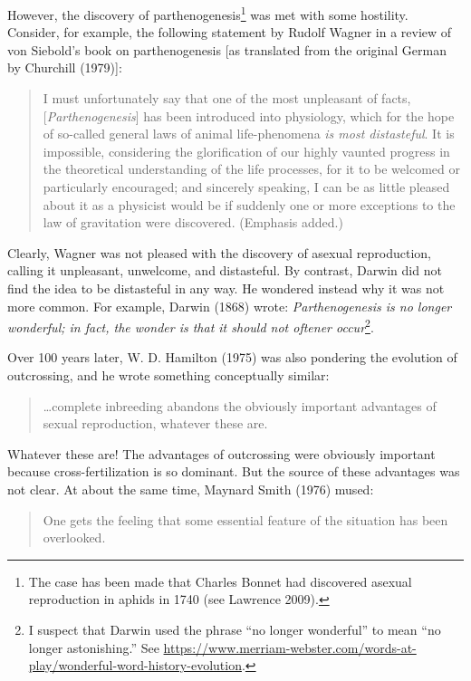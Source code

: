 \documentclass[
  letterpaper,
]{book}
\begin{document}
However, the discovery of parthenogenesis\footnote{The case has been
  made that Charles Bonnet had discovered asexual reproduction in aphids
  in 1740 (see Lawrence 2009).} was met with some hostility. Consider,
for example, the following statement by Rudolf Wagner in a review of von
Siebold's book on parthenogenesis {[}as translated from the original
German by Churchill (1979){]}:

\begin{quote}
I must unfortunately say that one of the most unpleasant of facts,
{[}\emph{Parthenogenesis}{]} has been introduced into physiology, which
for the hope of so-called general laws of animal life-phenomena \emph{is
most distasteful}. It is impossible, considering the glorification of
our highly vaunted progress in the theoretical understanding of the life
processes, for it to be welcomed or particularly encouraged; and
sincerely speaking, I can be as little pleased about it as a physicist
would be if suddenly one or more exceptions to the law of gravitation
were discovered. (Emphasis added.)
\end{quote}

Clearly, Wagner was not pleased with the discovery of asexual
reproduction, calling it unpleasant, unwelcome, and distasteful. By
contrast, Darwin did not find the idea to be distasteful in any way. He
wondered instead why it was not more common. For example, Darwin (1868)
wrote: \emph{Parthenogenesis is no longer wonderful; in fact, the wonder
is that it should not oftener occur}\footnote{I suspect that Darwin used
  the phrase ``no longer wonderful'' to mean ``no longer astonishing.''
  See
  \url{https://www.merriam-webster.com/words-at-play/wonderful-word-history-evolution}.}.

Over 100 years later, W. D. Hamilton (1975) was also pondering the
evolution of outcrossing, and he wrote something conceptually similar:

\begin{quote}
\ldots complete inbreeding abandons the obviously important advantages
of sexual reproduction, whatever these are.
\end{quote}

Whatever these are! The advantages of outcrossing were obviously
important because cross-fertilization is so dominant. But the source of
these advantages was not clear. At about the same time, Maynard Smith
(1976) mused:

\begin{quote}
One gets the feeling that some essential feature of the situation has
been overlooked.
\end{quote}
\end{document}
